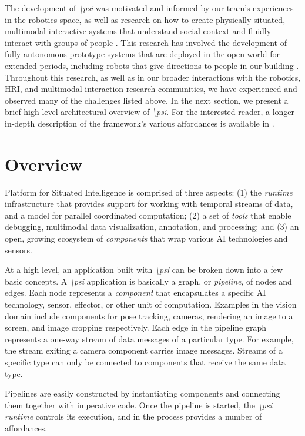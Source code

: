 \documentclass[letterpaper]{article}
\newcommand{\psif}{\emph{\textbackslash psi} }
\newcommand{\psifnospace}{\emph{\textbackslash psi}}
\begin{document}
The development of \psif was motivated and informed by our team's experiences in the robotics space, as well as research on how to create physically situated, multimodal interactive systems that understand social context and fluidly interact with groups of people \cite{bohus2009models,bohus2011,andrist2016you,bohus2017study,tan2020now}. This research has involved the development of fully autonomous prototype systems that are deployed in the open world for extended periods, including robots that give directions to people in our building \cite{bohus2014directions}. Throughout this research, as well as in our broader interactions with the robotics, HRI, and multimodal interaction research communities, we have experienced and observed many of the challenges listed above. In the next section, we present a brief high-level architectural overview of \psifnospace. For the interested reader, a longer in-depth description of the framework's various affordances is available in \cite{bohus2020psi}.

\section{Overview}

Platform for Situated Intelligence is comprised of three aspects: (1) the \textit{runtime} infrastructure that provides support for working with temporal streams of data, and a model for parallel coordinated computation; (2) a set of \textit{tools} that enable debugging, multimodal data visualization, annotation, and processing; and (3) an open, growing ecosystem of \textit{components} that wrap various AI technologies and sensors.

At a high level, an application built with \psif can be broken down into a few basic concepts. A \psif application is basically a graph, or \emph{pipeline}, of nodes and edges. Each node represents a \emph{component} that encapsulates a specific AI technology, sensor, effector, or other unit of computation. Examples in the vision domain include components for pose tracking, cameras, rendering an image to a screen, and image cropping respectively. Each edge in the pipeline graph represents a one-way stream of data messages of a particular type. For example, the stream exiting a camera component carries image messages. Streams of a specific type can only be connected to components that receive the same data type.

Pipelines are easily constructed by instantiating components and connecting them together with imperative code. Once the pipeline is started, the \psif \emph{runtime} controls its execution, and in the process provides a number of affordances.
\end{document}
